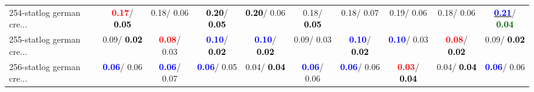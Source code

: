 \begin{table}[h]
\begin{center}
{\begin{tabular}{lc|c|c|c|c|c|c|c|c}
254-statlog german cre... & \textcolor{red}{\textbf{  0.17}}/\textcolor{black}{\textbf{  0.05}} &   0.18/  0.06 & \textcolor{black}{\textbf{  0.20}}/\textcolor{black}{\textbf{  0.05}} & \textcolor{black}{\textbf{  0.20}}/  0.06 &   0.18/\textcolor{black}{\textbf{  0.05}} &   0.18/  0.07 &   0.19/  0.06 &   0.18/  0.06 & \underline{\textcolor{blue}{\textbf{  0.21}}}/\textcolor{darkgreen}{\textbf{  0.04}} \\
255-statlog german cre... &   0.09/\textcolor{black}{\textbf{  0.02}} & \textcolor{red}{\textbf{  0.08}}/  0.03 & \textcolor{blue}{\textbf{  0.10}}/\textcolor{black}{\textbf{  0.02}} & \textcolor{blue}{\textbf{  0.10}}/\textcolor{black}{\textbf{  0.02}} &   0.09/  0.03 & \textcolor{blue}{\textbf{  0.10}}/\textcolor{black}{\textbf{  0.02}} & \textcolor{blue}{\textbf{  0.10}}/  0.03 & \textcolor{red}{\textbf{  0.08}}/\textcolor{black}{\textbf{  0.02}} &   0.09/\textcolor{black}{\textbf{  0.02}} \\
256-statlog german cre... & \textcolor{blue}{\textbf{  0.06}}/  0.06 & \textcolor{blue}{\textbf{  0.06}}/  0.07 & \textcolor{blue}{\textbf{  0.06}}/  0.05 &   0.04/\textcolor{black}{\textbf{  0.04}} & \textcolor{blue}{\textbf{  0.06}}/  0.06 & \textcolor{blue}{\textbf{  0.06}}/  0.06 & \textcolor{red}{\textbf{  0.03}}/\textcolor{black}{\textbf{  0.04}} &   0.04/\textcolor{black}{\textbf{  0.04}} & \textcolor{blue}{\textbf{  0.06}}/  0.06 \\\end{tabular}}\label{stratsALCKappa7AllReduxalla}
\end{center}
\end{table}
